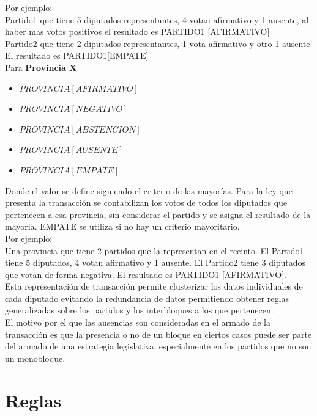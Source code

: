 \documentclass{endm}
\begin{document}
Por ejemplo: \\

Partido1 que tiene 5 diputados representantes, 4 votan afirmativo y 1 ausente, al haber mas votos positivos el resultado es PARTIDO1 [AFIRMATIVO] \\

Partido2 que tiene 2 diputados representantes, 1 vota afirmativo y otro 1 ausente. El resultado es PARTIDO1[EMPATE] \\

Para \textbf{Provincia X} \\

\begin{itemize}
\item $PROVINCIA [AFIRMATIVO]$
\item $PROVINCIA [NEGATIVO]$
\item $PROVINCIA [ABSTENCION]$
\item $PROVINCIA [AUSENTE]$ 
\item $PROVINCIA [EMPATE]$ \\
\end{itemize}

Donde el valor se define siguiendo el criterio de las mayorías. Para la ley que presenta la transacción se contabilizan los votos de todos los diputados que pertenecen a esa provincia, sin considerar el partido y se asigna el resultado de la mayoria. EMPATE se utiliza si no hay un criterio mayoritario. \\

Por ejemplo: \\

Una provincia que tiene 2 partidos que la representan en el recinto. El Partido1 tiene 5 diputados, 4 votan afirmativo y 1 ausente. El Partido2 tiene 3 diputados que votan de forma negativa. El resultado es PARTIDO1 [AFIRMATIVO]. \\

Esta representación de transacción permite clusterizar los datos individuales de cada diputado evitando la redundancia de datos permitiendo obtener reglas generalizadas sobre los partidos y los interbloques a los que pertenecen. \\

El motivo por el que las ausencias son consideradas en el armado de la transacción es que la presencia o no de un bloque en ciertos casos puede ser parte del armado de una estrategia legislativa, especialmente en los partidos que no son un monobloque.

\section{Reglas}\label{desarrollo}
\end{document}
